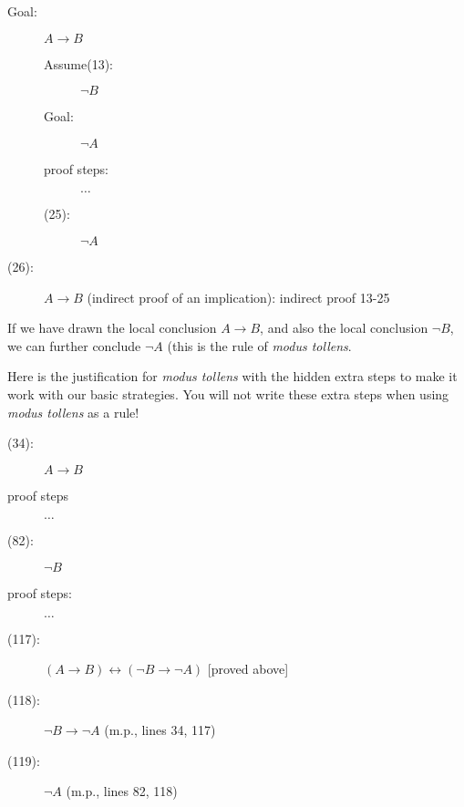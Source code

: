 \documentclass[12pt]{article}
\begin{document}
\begin{description}

\item[Goal:]  $A \rightarrow B$

\begin{description}

\item[Assume(13):]  $\neg B$

\item[Goal:]  $\neg A$

\item[proof steps:]  $\ldots$

\item[(25):]  $\neg A$

\end{description}



\item[(26):]  $A \rightarrow B$  (indirect proof of an implication):  indirect proof 13-25

\end{description}

If we have drawn the local conclusion $A \rightarrow B$, and also the
local conclusion $\neg B$, we can further conclude $\neg A$ (this is
the rule of {\em modus tollens\/}. 

Here is the justification for {\em modus tollens\/} with the hidden extra steps to make it work with our basic strategies.
You will not write these extra steps when using {\em modus tollens\/} as a rule!

\begin{description}

\item[(34):]  $A \rightarrow B$

\item[proof steps] $\ldots$

\item [(82):] $\neg B$

\item [proof steps:]  $\ldots$

\item[(117):]  $(A \rightarrow B) \leftrightarrow (\neg B \rightarrow \neg A)$ [proved above]

\item[(118):]  $\neg B \rightarrow \neg A$  (m.p., lines 34, 117)

\item[(119):]  $\neg A$ (m.p., lines 82, 118)

\end{description}
\end{document}
